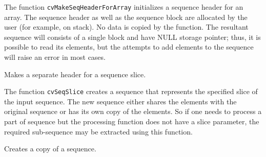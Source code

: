 The function \texttt{cvMakeSeqHeaderForArray} initializes a sequence
header for an array. The sequence header as well as the sequence block are
allocated by the user (for example, on stack). No data is copied by the
function. The resultant sequence will consists of a single block and
have NULL storage pointer; thus, it is possible to read its elements,
but the attempts to add elements to the sequence will raise an error in
most cases.

\label{SeqSlice}

Makes a separate header for a sequence slice.


\begin{description}
\end{description}

The function \texttt{cvSeqSlice} creates a sequence that represents the specified slice of the input sequence. The new sequence either shares the elements with the original sequence or has its own copy of the elements. So if one needs to process a part of sequence but the processing function does not have a slice parameter, the required sub-sequence may be extracted using this function.

\fi

\label{CloneSeq}

Creates a copy of a sequence.


\begin{description}
\end{description}

